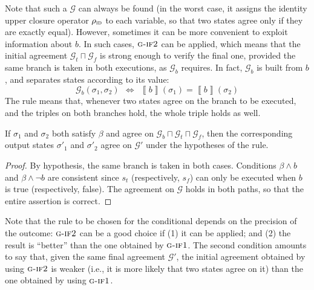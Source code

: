 \documentclass[prodmode,acmtocl]{acmsmall}
\def\state{\ensuremath{\sigma}\xspace}
\def\uco{\ensuremath{\rho}\xspace}
\newcommand{\0}{\mbox{\bf 0}}
\newcommand{\SEMANTICS}[1]{\left\llbracket #1 \right\rrbracket}
\def\IDDOM{\ensuremath{\uco_{\textsc{id}}}\xspace}
\def\PRED{\beta}
\def\AGREEM{\mathcal{G}}
\newcommand{\GRULENAME}[1]{\textsc{g-#1}}
\begin{document}
Note that such a $\AGREEM$ can always be found (in the worst case, it
assigns the identity upper closure operator $\IDDOM$ to each variable,
so that two states agree only if they are exactly equal).  However,
sometimes it can be more convenient to exploit information about $b$.
In such cases, $\GRULENAME{if2}$ can be applied, which means that the
initial agreement $\AGREEM_t \sqcap \AGREEM_f$ is strong enough to
verify the final one, provided the same branch is taken in both
executions, as $\AGREEM_b$ requires.  In fact, $\AGREEM_b$ is built
from $b$, and separates states according to its value:
\[
  \AGREEM_b(\state_1,\state_2) \ \ \Leftrightarrow
  \ \ \SEMANTICS{b}(\state_1) = \SEMANTICS{b}(\state_2)
\]
\noindent
The rule means that, whenever two states agree on the branch to be
executed, and the triples on both branches hold, the whole triple
holds as well.

\begin{lemma}[soundness of $\GRULENAME{if2}$]
  \label{lemma:aIfPPSoundness} If $\state_1$ and $\state_2$ both
  satisfy $\PRED$ and agree on
  $\AGREEM_b\sqcap\AGREEM_t\sqcap\AGREEM_f$, then the corresponding
  output states $\state'_1$ and $\state'_2$ agree on $\AGREEM'$ under
  the hypotheses of the rule.
\end{lemma}

\begin{proof}
  By hypothesis, the same branch is taken in both cases.  Conditions
  $\PRED\wedge b$ and $\PRED\wedge \lnot b$ are consistent since $s_t$
  (respectively, $s_f$) can only be executed when $b$ is true
  (respectively, false).  The agreement on $\AGREEM$ holds in both
  paths, so that the entire assertion is correct.
\end{proof}

Note that the rule to be chosen for the conditional depends on the
precision of the outcome: $\GRULENAME{if2}$ can be a good choice if
(1) it can be applied; and (2) the result is ``better'' than the one
obtained by $\GRULENAME{if1}$.  The second condition amounts to say
that, given the same final agreement $\AGREEM'$, the initial agreement
obtained by using $\GRULENAME{if2}$ is weaker (i.e., it is more likely
that two states agree on it) than the one obtained by using
$\GRULENAME{if1}$.
\end{document}
